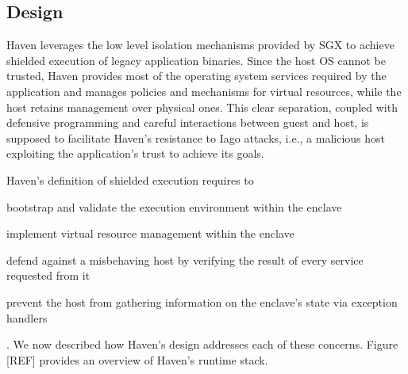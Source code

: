 \subsection{Design}
%
%
%
Haven leverages the low level isolation mechanisms provided by SGX to achieve shielded execution of legacy application binaries.
Since the host OS cannot be trusted, Haven provides most of the operating system services required by the application and manages policies and mechanisms for virtual resources, while the host retains management over physical ones.
This clear separation, coupled with defensive programming and careful interactions between guest and host, is supposed to facilitate Haven's resistance to Iago attacks, i.e., a malicious host exploiting the application's trust to achieve its goals.

Haven's definition of shielded execution requires to
\begin{enumerate*}
	\item bootstrap and validate the execution environment within the enclave
	\item implement virtual resource management within the enclave
	\item defend against a misbehaving host by verifying the result of every service requested from it
	\item prevent the host from gathering information on the enclave's state via exception handlers
\end{enumerate*}.
We now described how Haven's design addresses each of these concerns.
Figure [REF] provides an overview of Haven's runtime stack.

